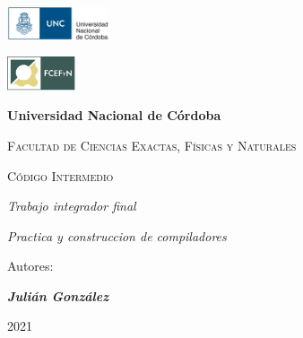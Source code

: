 \begin{titlepage}
    \centering
    {\includegraphics[width=0.225\textwidth]{../img/logo.jpg}}
    \hspace{1cm}
    {\includegraphics[width=0.15\textwidth]{../img/fcefyn.png}\par}
    \vspace{1cm}
    {\bfseries\LARGE Universidad Nacional de Córdoba \par}
    \vspace{0.7cm}
    {\scshape\Large Facultad de Ciencias Exactas, Físicas y Naturales\par}
    \vspace{2cm}
    {\scshape\Huge Código Intermedio \par}
    \vspace{3cm}
    {\itshape\Large Trabajo integrador final \par}
    \vspace{2cm}
    {\itshape\large Practica y construccion de compiladores \par}
    \vfill
    \vspace{0.5cm}
    {\Large Autores: \par}
    \vspace{0.5cm}
    {\Large \textbf\emph{Julián González}\par}
    \vfill
    \vspace{0.2cm} 
    {\small 2021 \par}
\end{titlepage}


